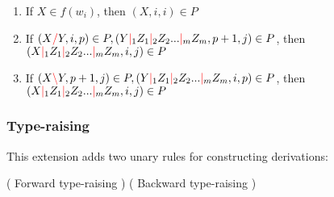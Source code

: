 \documentclass[main.tex]{subfiles}
\begin{document}
\begin{enumerate}
    \item If $X \in f(w_i)$, then $(X, i, i) \in P$
    \item If $(X \textcolor{red}{/} Y, i, p) \in P, (Y \textcolor{red}{|}_1 Z_1 \textcolor{red}{|}_2 Z_2 ... \textcolor{red}{|}_m Z_m, p + 1, j) \in P$,
        then $(X \textcolor{red}{|}_1 Z_1 \textcolor{red}{|}_2 Z_2 ... \textcolor{red}{|}_m Z_m, i, j) \in P$
    \item If $(X \textcolor{red}{\backslash} Y, p + 1, j) \in P, (Y \textcolor{red}{|}_1 Z_1 \textcolor{red}{|}_2 Z_2 ... \textcolor{red}{|}_m Z_m, i, p) \in P$,
        then $(X \textcolor{red}{|}_1 Z_1 \textcolor{red}{|}_2 Z_2 ... \textcolor{red}{|}_m Z_m, i, j) \in P$
\end{enumerate}


\subsubsection{Type-raising}
This extension adds two unary rules for constructing derivations: \cite[sec.~5.3.1]{nts}
\begin{center}
        ( Forward type-raising )
        ( Backward type-raising )
\end{center}
\end{document}
